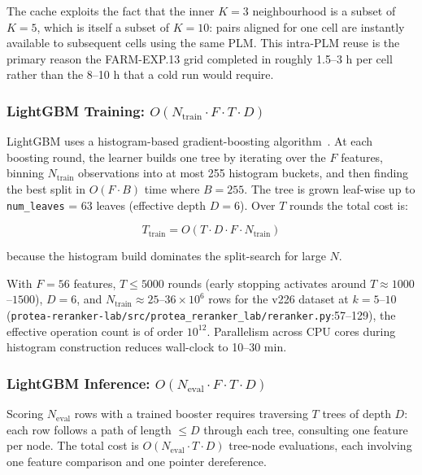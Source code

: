 The cache exploits the fact that the inner $K = 3$ neighbourhood is a subset
of $K = 5$, which is itself a subset of $K = 10$: pairs aligned for one cell
are instantly available to subsequent cells using the same PLM. This
intra-PLM reuse is the primary reason the FARM-EXP.13 grid completed in
roughly 1.5--3 h per cell rather than the 8--10 h that a cold run would
require.

\subsubsection{LightGBM Training: $O(N_{\text{train}} \cdot F \cdot T \cdot D)$}
\label{sssec:lgbm-train}

LightGBM uses a histogram-based gradient-boosting
algorithm~\cite{ke2017lightgbm}. At each boosting round, the learner builds
one tree by iterating over the $F$ features, binning $N_{\mathrm{train}}$
observations into at most 255 histogram buckets, and then finding the best
split in $O(F \cdot B)$ time where $B = 255$. The tree is grown
leaf-wise up to \texttt{num\_leaves} = 63 leaves (effective depth $D = 6$).
Over $T$ rounds the total cost is:

\begin{equation}
  T_{\mathrm{train}} = O\!\left(T \cdot D \cdot F \cdot N_{\mathrm{train}}\right)
\end{equation}

because the histogram build dominates the split-search for large $N$.

\begin{definition}
  With $F = 56$ features, $T \leq 5000$ rounds (early stopping activates
  around $T \approx 1000$--$1500$), $D = 6$, and
  $N_{\mathrm{train}} \approx 25$--$36 \times 10^6$ rows for the v226 dataset
  at $k = 5$--$10$
  (\texttt{protea-reranker-lab/src/protea\_reranker\_lab/reranker.py}:57--129),
  the effective operation count is of order $10^{12}$. Parallelism across
  CPU cores during histogram construction reduces wall-clock to 10--30 min.
\end{definition}

\subsubsection{LightGBM Inference: $O(N_{\text{eval}} \cdot F \cdot T \cdot D)$}
\label{sssec:lgbm-infer}

Scoring $N_{\mathrm{eval}}$ rows with a trained booster requires traversing
$T$ trees of depth $D$: each row follows a path of length $\leq D$ through
each tree, consulting one feature per node. The total cost is
$O(N_{\mathrm{eval}} \cdot T \cdot D)$ tree-node evaluations, each
involving one feature comparison and one pointer dereference.

